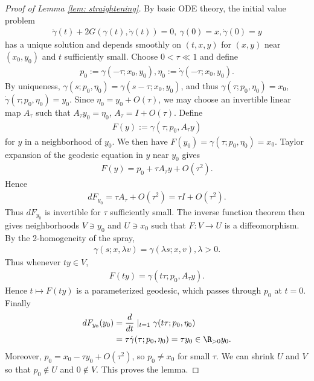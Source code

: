 \documentclass{article}
\numberwithin{equation}{section}
\theoremstyle{plain}
\begin{document}
\begin{proof}[Proof of Lemma \ref{lem: straightening}]
    By basic ODE theory, the initial value problem 
    \begin{align}
        \ddot \gamma(t) + 2 G(\gamma(t),\dot \gamma(t)) = 0, \ \gamma(0) = x, \dot \gamma(0)=y
    \end{align}
    has a unique solution and depends smoothly on $(t,x,y)$ for $(x,y)$ near $(x_0,y_0)$ and $t$ sufficiently small. Choose $0 < \tau \ll 1$ and define 
    \begin{align}
        p_0:=\gamma(-\tau; x_0,y_0),\eta_0:=\dot \gamma(-\tau;x_0,y_0).
    \end{align}
    By uniqueness, $\gamma(s;p_0,\eta_0) = \gamma(s-\tau;x_0,y_0)$, and thus $\gamma(\tau;p_0,\eta_0)=x_0$, $\dot \gamma(\tau;p_0,\eta_0)=y_0$. Since $\eta_0=y_0+O(\tau)$, we may choose an invertible linear map $A_\tau$ such that $A_\tau y_0 = \eta_0$, $A_\tau = I + O(\tau)$. Define 
    \begin{align}
        F(y):=\gamma(\tau;p_0,A_\tau y)
     \end{align}
     for $y$ in a neighborhood of $y_0$. We then have $F(y_0) =\gamma(\tau;p_0,\eta_0)=x_0$.
     Taylor expansion of the geodesic equation in $y$ near $y_0$ gives 
     \begin{align}
         F(y) = p_0 + \tau A_\tau y +O(\tau^2).
     \end{align}
     Hence 
     \begin{align}
         dF_{y_0} = \tau A_\tau + O(\tau^2) = \tau I + O(\tau^2).
     \end{align}
     Thus $dF_{y_0}$ is invertible for $\tau$ sufficiently small. The inverse function theorem then gives neighborhoods $V \ni y_0$ and $U \ni x_0$ such that $F : V \to U$ is a diffeomorphism. By the 2-homogeneity of the spray, 
     \begin{align}
         \gamma(s;x,\lambda v) = \gamma(\lambda s;x,v), \lambda > 0.
     \end{align}
     Thus whenever $ty\in V$,
     \begin{align}
         F(ty) = \gamma(t\tau; p_0, A_\tau y).
     \end{align}
     Hence $t \mapsto F(ty)$ is a parameterized geodesic, which passes through $p_0$ at $t=0$. Finally 
     \begin{align}
         dF_{y_0}(y_0) &= \frac{d}{dt}\mid_{t=1} \gamma(t\tau; p_0, \eta_0) \\
         &=\tau \dot \gamma(\tau; p_0,\eta_0) = \tau y_0 \in \R_{>0} y_0.
     \end{align}
     Moreover, $p_0 = x_0 - \tau y_0 + O(\tau^2)$, so $p_0 \neq x_0$ for small $\tau$. We can shrink $U$ and $V$ so that $p_0 \notin U$ and $0 \notin V$. This proves the lemma.
    \end{proof}
\end{document}
